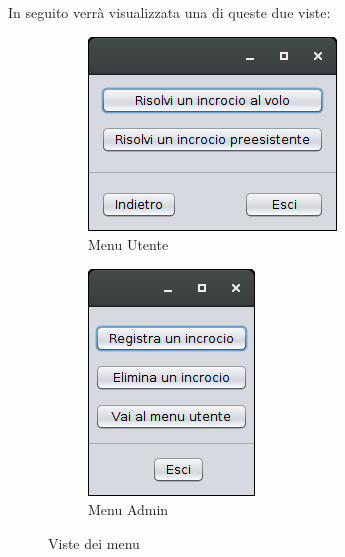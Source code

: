 In seguito verrà visualizzata una di queste due viste:
\begin{figure}[!htb]
	\centering
	\begin{subfigure}[b]{.4\textwidth}
		\includegraphics[width=\textwidth]{images/gui/user_gui}
		\caption{Menu Utente}
	\end{subfigure}
	\begin{subfigure}[b]{.4\textwidth}
		\includegraphics[width=\textwidth]{images/gui/admin_gui}
		\caption{Menu Admin}
	\end{subfigure}
	\caption{Viste dei menu}
\end{figure}

